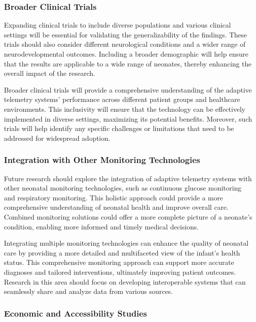 \documentclass[12pt,journal,compsoc]{IEEEtran}
\begin{document}
\subsubsection{Broader Clinical Trials}

Expanding clinical trials to include diverse populations and various clinical settings will be essential for validating the generalizability of the findings. These trials should also consider different neurological conditions and a wider range of neurodevelopmental outcomes. Including a broader demographic will help ensure that the results are applicable to a wide range of neonates, thereby enhancing the overall impact of the research.

Broader clinical trials will provide a comprehensive understanding of the adaptive telemetry systems' performance across different patient groups and healthcare environments. This inclusivity will ensure that the technology can be effectively implemented in diverse settings, maximizing its potential benefits. Moreover, such trials will help identify any specific challenges or limitations that need to be addressed for widespread adoption.

\subsubsection{Integration with Other Monitoring Technologies}

Future research should explore the integration of adaptive telemetry systems with other neonatal monitoring technologies, such as continuous glucose monitoring and respiratory monitoring. This holistic approach could provide a more comprehensive understanding of neonatal health and improve overall care. Combined monitoring solutions could offer a more complete picture of a neonate's condition, enabling more informed and timely medical decisions.

Integrating multiple monitoring technologies can enhance the quality of neonatal care by providing a more detailed and multifaceted view of the infant's health status. This comprehensive monitoring approach can support more accurate diagnoses and tailored interventions, ultimately improving patient outcomes. Research in this area should focus on developing interoperable systems that can seamlessly share and analyze data from various sources.

\subsubsection{Economic and Accessibility Studies}
\end{document}

